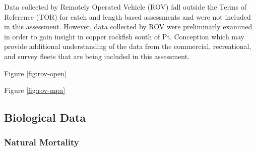 \documentclass[11pt,
  english,
  a4paper,
]{article}
\begin{document}
\leavevmode\tagmcend\tagstructend


Data collected by Remotely Operated Vehicle (ROV) fall outside the Terms of Reference (TOR) for catch and length based assessments and were not included in this assessment. However, data collected by ROV were preliminarly examined in order to gain insight in copper rockfish south of Pt. Conception which may provide additional understanding of the data from the commercial, recreational, and survey fleets that are being included in this assessment.

\leavevmode\tagmcend\tagstructend\par


Figure \ref{fig:rov-open}

\leavevmode\tagmcend\tagstructend\par


Figure \ref{fig:rov-mpa}

\leavevmode\tagmcend\tagstructend\par


\hypertarget{biological-data}{%
\subsection{Biological Data}\label{biological-data}}

\leavevmode\tagmcend\tagstructend


\hypertarget{natural-mortality}{%
\subsubsection{Natural Mortality}\label{natural-mortality}}

\leavevmode\tagmcend\tagstructend

\end{document}
